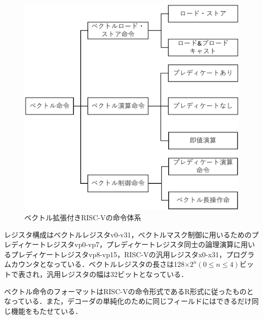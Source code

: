 \begin{figure}[tb]
    \centering
    \includegraphics[scale=0.5]{image/Inst_map.pdf}
    \caption{ベクトル拡張付きRISC-Vの命令体系}
    \label{fig:Inst_map}
\end{figure}

レジスタ構成はベクトルレジスタv0-v31，ベクトルマスク制御に用いるためのプレディケートレジスタvp0-vp7，プレディケートレジスタ同士の論理演算に用いるプレディケートレジスタvp8-vp15，RISC-Vの汎用レジスタx0-x31，プログラムカウンタとなっている．ベクトルレジスタの長さは128$\times 2^n(0\leq n\leq 4)$ビットで表され，汎用レジスタの幅は32ビットとなっている．

ベクトル命令のフォーマットはRISC-Vの命令形式であるR形式に従ったものとなっている．また，デコーダの単純化のために同じフィールドにはできるだけ同じ機能をもたせている．

